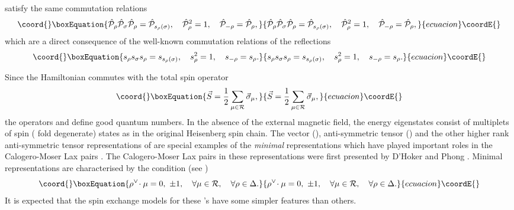 \documentclass[a4paper,12pt]{article}
\begin{document}
satisfy the same commutation relations
\begin{equation}\coord{}\boxEquation{
  \hat{\cal P}_{\rho}\hat{\cal P}_{\sigma}\hat{\cal P}_{\rho}
   =\hat{\cal P}_{s_{\rho}(\sigma)},\quad
\hat{\cal P}_{\rho}^2=1,\quad \hat{\cal P}_{-\rho}=\hat{\cal
P}_{\rho},
\label{pcom}
}{
  \hat{\cal P}_{\rho}\hat{\cal P}_{\sigma}\hat{\cal P}_{\rho}
   =\hat{\cal P}_{s_{\rho}(\sigma)},\quad
\hat{\cal P}_{\rho}^2=1,\quad \hat{\cal P}_{-\rho}=\hat{\cal
P}_{\rho},
}{ecuacion}\coordE{}\end{equation}
which are a direct consequence of the well-known commutation relations of
the
reflections
\begin{equation}\coord{}\boxEquation{
{s}_{\rho}{s}_{\sigma}{s}_{\rho}
   ={s}_{s_{\rho}(\sigma)},\quad
{s}_{\rho}^2=1,\quad {s}_{-\rho}={s}_{\rho}.
}{
{s}_{\rho}{s}_{\sigma}{s}_{\rho}
   ={s}_{s_{\rho}(\sigma)},\quad
{s}_{\rho}^2=1,\quad {s}_{-\rho}={s}_{\rho}.
}{ecuacion}\coordE{}\end{equation}


Since the
Hamiltonian commutes with the total spin operator
\begin{equation}\coord{}\boxEquation{
\vec{S}={1\over2}\sum_{\mu\in{\cal R}}\vec{\sigma}_\mu,
}{
\vec{S}={1\over2}\sum_{\mu\in{\cal R}}\vec{\sigma}_\mu,
}{ecuacion}\coordE{}\end{equation}
the operators \coordHE{} and \coordHE{} define good quantum numbers.
In the absence of the
external magnetic field, the energy eigenstates
consist of \coordHE{} multiplets of
spin \coordHE{} (\coordHE{} fold degenerate) states  as in
the original Heisenberg spin chain.
  The vector (\coordHE{}),
anti-symmetric tensor (\coordHE{})
and the other higher rank anti-symmetric tensor representations
of \coordHE{} are special
examples of the {\em minimal\/} representations which have played
important roles in
the Calogero-Moser Lax pairs \cite{DHoker_Phong,bcs1,bcs2,bms,cfs1}.
The Calogero-Moser Lax pairs in these representations were first presented
by
D'Hoker and Phong \cite{DHoker_Phong}.
Minimal representations are characterised by
the condition (see \cite{bcs1,bcs2})
\begin{equation}\coord{}\boxEquation{
\rho^\vee\!\cdot\mu=0,\ \pm1,\quad \forall \mu\in{\cal R},\quad
\forall\rho\in\Delta.
}{
\rho^\vee\!\cdot\mu=0,\ \pm1,\quad \forall \mu\in{\cal R},\quad
\forall\rho\in\Delta.
}{ecuacion}\coordE{}\end{equation}
It is expected that the spin exchange models for these \coordHE{}'s have
some
simpler features than others.
\end{document}
